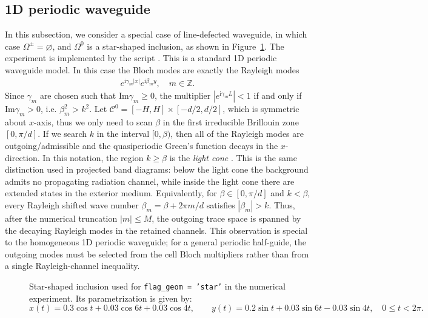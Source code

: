 \documentclass[11pt,fleqn]{article}
\renewcommand{\Im}{\mathrm{Im}}
\newcommand{\ii}{\mathrm{i}}
\theoremstyle{definition}
\theoremstyle{remark}
\begin{document}
\subsection{1D periodic waveguide}
In this subsection, we consider a special case of line-defected waveguide, in which case
\(\Omega^\pm = \varnothing\), and \(\Omega^0\) is a star-shaped inclusion, as
shown in Figure~\ref{fig:1d-waveguide-inclusion}. The experiment is
implemented by the script . This is
a standard 1D periodic waveguide model. In this case the Bloch modes are exactly the Rayleigh modes\begin{align*}
  e^{\ii \gamma_m |x|}e^{\ii \beta_m y},\quad m\in\mathbb{Z}.
\end{align*}
Since $\gamma_m$ are chosen such that $\Im \gamma_m \geq 0$, the multiplier $|e^{\ii \gamma_m L}| < 1$ if and only if $\Im \gamma_m > 0$, i.e. $\beta_m^2 > k^2$. Let 
$\mathcal{C}^0 = [-H, H] \times [-d/2, d/2]$, which is symmetric about $x$-axis, thus
we only need to scan $\beta$ in the first irreducible Brillouin zone \([0,\pi/d]\). 
If we search $k$ in the interval $[0, \beta)$, then all of the Rayleigh modes are
outgoing/admissible and the quasiperiodic Green's function decays in the $x$-direction.
In this notation, the region \(k\geq \beta\) is the \emph{light cone}
\cite[Chapter~7]{Joannopoulos2011}. This is the
same distinction used in projected band diagrams: below the light cone the
background admits no propagating radiation channel, while inside the light cone
there are extended states in the exterior medium. Equivalently, for
\(\beta\in[0,\pi/d]\) and \(k<\beta\), every Rayleigh shifted wave number
\(\beta_m=\beta+2\pi m/d\) satisfies \(|\beta_m|>k\). Thus, after the numerical
truncation \(|m|\leq M\), the outgoing trace space is spanned by the decaying
Rayleigh modes in the retained channels. This observation is special to
the homogeneous 1D periodic waveguide; for a general periodic half-guide, the
outgoing modes must be selected from the cell Bloch multipliers rather than
from a single Rayleigh-channel inequality.

\begin{figure}[htbp]
\centering
{}
\caption{Star-shaped inclusion used for \texttt{flag\_geom = 'star'} in the
numerical experiment. Its parametrization is given by:
\[
  x(t)=0.3\cos t+0.03\cos 6t+0.03\cos 4t,\qquad
  y(t)=0.2\sin t+0.03\sin 6t-0.03\sin 4t,
  \quad 0\leq t<2\pi .
\]}
\label{fig:1d-waveguide-inclusion}
\end{figure}
\end{document}
